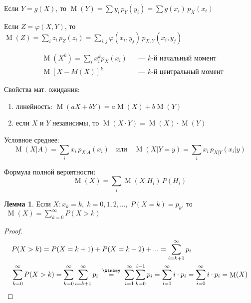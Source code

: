 \documentclass[a4paper,12pt,fleqn]{article}
\newenvironment{onsamepage} {\begin{minipage}{\textwidth}} {\end{minipage}}
\numberwithin{figure}{section}
\theoremstyle{definition}
\newtheorem{lemma}{Лемма}[section]
\let\phi\varphi
\def\on{\!:}
\DeclareMathOperator{\M}{M}
\begin{document}
Если $Y=g(X)$,
то $\M(Y)=\sum y_i \, p_Y(y_i) = \sum g(x_i) \, p_X(x_i)$

Если $Z=\phi(X,Y)$,
то $\M(Z) = \sum_i z_i \, p_Z(z_i) = \sum_{i,j} \phi(x_i,y_j) \, p_{X,Y}(x_i,y_j)$

\begin{align*}
&	\M(X^k) = \sum_i x_i^k p_X(x_i) &&\text{--- $k$-й начальный момент} \\
&	\M[X-M(X)]^k 	&&\text{--- $k$-й центральный момент}
\end{align*}

\begin{onsamepage}
Свойства мат. ожидания:
\begin{enumerate}
	\item линейность: $\M(aX+bY) = a\M(X)+b\M(Y)$
	\item если $X$ и $Y$ независимы, то $\M(X\cdot Y) = \M(X)\cdot \M(Y)$
\end{enumerate}
\end{onsamepage}

\bigskip
Условное среднее:
\[	\M(X|A) = \sum_i x_i \, p_{X|A}(x_i)
	\quad\text{или}\quad
	\M(X|Y=y) = \sum_i x_i \, p_{X|Y}(x_i|y) \]

Формула полной вероятности:
\[ \M(X) = \sum_i \M(X|H_i) \, P(H_i)  \]


\begin{lemma}
	Если $X\on x_k=k ,\; k=0,1,2,... ,\; P(X=k)=p_k$,
	то $\; \M(X)=\sum_{k=0}^{\infty}P(X>k)$
\end{lemma}
\begin{proof}
\begin{align*}
&	P(X>k) = P(X=k+1) + P(X=k+2) + ... = \sum_{i=k+1}^{\infty}p_i \\
&	\sum_{k=0}^{\infty}P(X>k) =
	\sum_{k=0}^{\infty} \sum_{i=k+1}^{\infty}p_i
	\; \overset{\Winkey}{=} \;
	\sum_{i=1}^{\infty} \sum_{k=0}^{i-1} p_i =
	\sum_{i=1}^{\infty} i \cdot p_i =
	\sum_{i=0}^{\infty} i \cdot p_i = \M(X)
\end{align*}
\end{proof}
\end{document}
